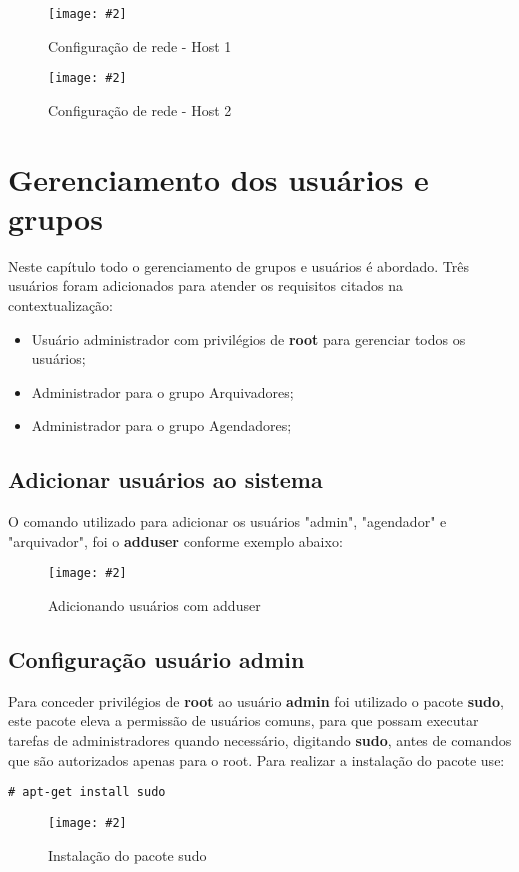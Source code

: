 \documentclass[
	12pt,				%
	openany,			%
	a4paper,			%
	chapter=TITLE,		%
	section=TITLE,		%
	english,
	brazil				%
]{abntex2}
\newcommand{\includeImage}[3] {

\begin{figure}[H]
 	 \centering
  		\texttt{[image: \#2]}
  	\caption{#3}
\end{figure}

}
\begin{document}
\includeImage{0.5}{imgs/2_configuracao_rede/host/1_host_1.png}{Configuração de rede - Host 1}
\includeImage{0.5}{imgs/2_configuracao_rede/host/1_host_2.png}{Configuração de rede - Host 2}

\section{Gerenciamento dos usuários e grupos}

Neste capítulo todo o gerenciamento de grupos e usuários é abordado. Três usuários foram adicionados para atender os requisitos citados na contextualização:

\begin{itemize}
	\item Usuário administrador com privilégios de \textbf{root} para gerenciar todos os usuários;
	\item Administrador para o grupo Arquivadores;
	\item Administrador para o grupo Agendadores;
\end{itemize}

\subsection {Adicionar usuários ao sistema}
O comando utilizado para adicionar os usuários "admin", "agendador" e "arquivador", foi o \textbf{adduser} conforme exemplo abaixo:

\includeImage{0.7}{imgs/5_gerenciamento_grupos/adduser_exemplo.png}{Adicionando usuários com adduser}


\subsection{Configuração usuário admin}
Para conceder privilégios de \textbf{root} ao usuário \textbf{admin} foi utilizado o pacote \textbf{sudo}, este pacote eleva a permissão de usuários comuns, para que possam executar tarefas de administradores quando necessário, digitando \textbf{sudo}, antes de comandos que são autorizados apenas para o root. Para realizar a instalação do pacote use:

\begin{lstlisting}
# apt-get install sudo
\end{lstlisting}

\includeImage{0.7}{imgs/5_gerenciamento_grupos/instalando_sudo.png}{Instalação do pacote sudo}
\end{document}
